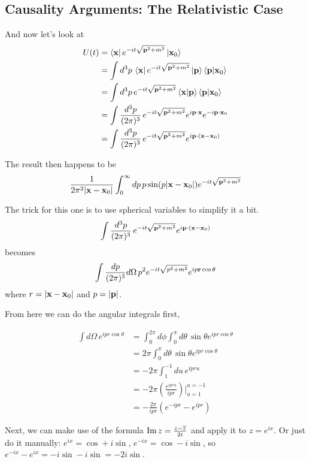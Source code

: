 \subsection{Causality Arguments: The Relativistic Case}

And now let's look at
\begin{align*}
U(t) &= \bra{\boldsymbol{\mathbf{x}}} e^{-it\sqrt{\boldsymbol{\mathbf{p}}^2 + m^2}} \ket{\boldsymbol{\mathbf{x}}_0} \\
&= \int d^3p \, \bra{\boldsymbol{\mathbf{x}}} e^{-it\sqrt{\boldsymbol{\mathbf{p}}^2 + m^2}} \ket{\boldsymbol{\mathbf{p}}} \braket{\boldsymbol{\mathbf{p}} | \boldsymbol{\mathbf{x}}_0} \\
&= \int d^3p \, e^{-it\sqrt{\boldsymbol{\mathbf{p}}^2 + m^2}} \braket{\boldsymbol{\mathbf{x}} | \boldsymbol{\mathbf{p}}} \braket{\boldsymbol{\mathbf{p}} | \boldsymbol{\mathbf{x}}_0} \\
&= \int \frac{d^3p}{(2\pi)^3} \, e^{-it\sqrt{\boldsymbol{\mathbf{p}}^2 + m^2}} e^{i\boldsymbol{\mathbf{p}}\cdot\boldsymbol{\mathbf{x}}} e^{-i\boldsymbol{\mathbf{p}}\cdot\boldsymbol{\mathbf{x}}_0} \\
&= \int \frac{d^3p}{(2\pi)^3} \, e^{-it\sqrt{\boldsymbol{\mathbf{p}}^2 + m^2}} e^{i\boldsymbol{\mathbf{p}}\cdot(\boldsymbol{\mathbf{x}} - \boldsymbol{\mathbf{x}}_0)} \\
\end{align*}

The result then happens to be
$$
\frac{1}{2\pi^2 |\boldsymbol{\mathbf{x}}-\boldsymbol{\mathbf{x}}_0|}
    \int_{0}^{\infty} dp \, p \sin(p|\boldsymbol{\mathbf{x}}-\boldsymbol{\mathbf{x}}_0|) e^{-it\sqrt{\boldsymbol{\mathbf{p}}^2 + m^2}}
$$

The trick for this one is to use spherical variables to simplify it a bit.
$$
\int \frac{d^3p}{(2\pi)^3} \, e^{-it\sqrt{\boldsymbol{\mathbf{p}}^2 + m^2}} e^{i\boldsymbol{\mathbf{p}}\cdot(\boldsymbol{\mathbf{x}} - \boldsymbol{\mathbf{x}}_0)} 
$$
becomes
$$
\int \frac{dp}{(2\pi)^3} d\Omega \, p^2 e^{-it\sqrt{p^2 + m^2}} e^{ip\boldsymbol{\mathbf{r}}\cos\theta} 
$$
where $r = |\boldsymbol{\mathbf{x}} - \boldsymbol{\mathbf{x}}_0|$ and $p = |\boldsymbol{\mathbf{p}}|$.

From here we can do the angular integrals first,

\begin{align*}
\int d\Omega \, e^{ipr\cos\theta} &= 
    \int_{0}^{2\pi} d\phi \int_{0}^{\pi} d\theta \, \sin\theta e^{ipr\cos\theta} \\
&= 2\pi \int_{0}^{\pi} d\theta \, \sin\theta e^{ipr\cos\theta} \\
&= -2\pi \int_{1}^{-1} du \, e^{ipr u} \\
&= -2\pi \left( \frac{ e^{ipr u} }{ ipr } \right) \Big|_{u=1}^{u=-1} \\
&= -\frac{2\pi}{ipr} \left( e^{-ipr} - e^{ipr} \right)
\end{align*}

Next, we can make use of the formula $\operatorname{Im}{z} = \frac{z - \overline{z}}{2i}$ and apply it to $z = e^{ix}$.
Or just do it manually: $e^{ix} = \cos + i\sin$, $e^{-ix} = \cos -i\sin$, so
$e^{-ix} - e^{ix} = -i\sin -i\sin = -2i \sin$.

